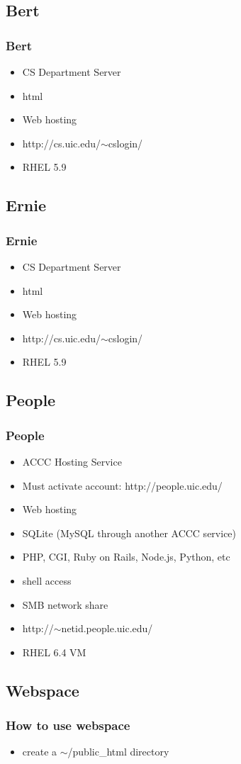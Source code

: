 \documentclass[hyperref={pdfpagelabels=false}]{beamer}
\begin{document}
\subsection{Bert}
\frame
{
    \frametitle{Bert}
    \begin{itemize}
    \item{CS Department Server}
    \item{html}
    \item{Web hosting}
    \item{http://cs.uic.edu/$\sim$cslogin/}
    \item{RHEL 5.9}
    \end{itemize}
}
\subsection{Ernie}
\frame
{
    \frametitle{Ernie}
    \begin{itemize}
    \item{CS Department Server}
    \item{html}
    \item{Web hosting}
    \item{http://cs.uic.edu/$\sim$cslogin/}
    \item{RHEL 5.9}
    \end{itemize}
}
\subsection{People}
\frame
{
    \frametitle{People}
    \begin{itemize}
    \item{ACCC Hosting Service}
    \item{Must activate account: http://people.uic.edu/}
    \item{Web hosting}
    \item{SQLite (MySQL through another ACCC service)}
    \item{PHP, CGI, Ruby on Rails, Node.js, Python, etc}
    \item{shell access}
    \item{SMB network share}
    \item{http://$\sim$netid.people.uic.edu/}
    \item{RHEL 6.4 VM}
    \end{itemize}
}
\subsection{Webspace}
\frame
{
    \frametitle{How to use webspace}
    \begin{itemize}
    \item{create a $\sim$/public\_html directory}
    \end{itemize}
}
\end{document}
